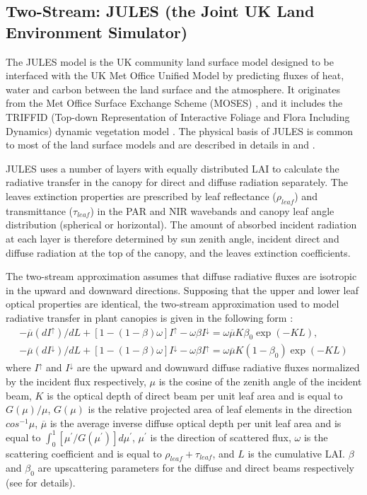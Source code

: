\subsection{Two-Stream: JULES (the Joint UK Land Environment Simulator)} 
The JULES model is the UK community land surface model designed to be interfaced with the UK Met Office Unified Model by predicting fluxes of heat, water and carbon between the land surface and the atmosphere. It originates from the Met Office Surface Exchange Scheme (MOSES) \citep{Cox1999}, and it includes the TRIFFID (Top-down Representation of Interactive Foliage and Flora Including Dynamics) dynamic vegetation model \citep{Cox2001}. The physical basis of JULES is common to most of the land surface models and are described in details in \citet{Best2011} and \citet{Clark2011}.

JULES uses a number of layers with equally distributed LAI to calculate the radiative transfer in the canopy for direct and diffuse radiation separately. The leaves extinction properties are prescribed by leaf reflectance ($\rho_{leaf}$) and transmittance ($\tau_{leaf}$) in the PAR and NIR wavebands and canopy leaf angle distribution (spherical or horizontal). The amount of absorbed incident radiation at each layer is therefore determined by sun zenith angle, incident direct and diffuse radiation at the top of the canopy, and the leaves extinction coefficients. 

The two-stream approximation assumes that diffuse radiative fluxes are isotropic in the upward and downward directions. Supposing that the upper and lower leaf optical properties are identical, the two-stream approximation used to model radiative transfer in plant canopies is given in the following form \citep{Dickinson1983,Sellers1985}: 
\begin{equation}
\begin{gathered}
-\overline{\mu}(dI^{\uparrow})/dL + [1 - (1 - \beta)\omega]I^{\uparrow} - \omega \beta I^{\downarrow} = \omega \overline{\mu} K \beta_0 \exp{(-KL)},\\
-\overline{\mu}(dI^{\downarrow})/dL + [1 - (1 - \beta)\omega]I^{\downarrow} - \omega \beta I^{\uparrow} = \omega \overline{\mu} K (1-\beta_0) \exp{(-KL)}
\end{gathered}
\label{equation:ts}
\end{equation}
\noindent where $I^{\uparrow}$ and $I^{\downarrow}$ are the upward and downward diffuse radiative fluxes normalized by the incident flux respectively, $\mu$ is the cosine of the zenith angle of the incident beam, $K$ is the optical depth of direct beam per unit leaf area and is equal to $G(\mu)/\mu$, $G(\mu)$ is the relative projected area of leaf elements in the direction $cos^{-1}\mu$, $\overline{\mu}$ is the average inverse diffuse optical depth per unit leaf area and is equal to $\int_{0}^{1}[\mu^{\prime}/G(\mu^{\prime})]d\mu^{\prime}$, $\mu^{\prime}$ is the direction of scattered flux, $\omega$ is the scattering coefficient and is equal to $\rho_{leaf} + \tau_{leaf}$, and $L$ is the cumulative LAI. $\beta$ and $\beta_0$ are upscattering parameters for the diffuse and direct beams respectively (see \citet{Sellers1985} for details). 


